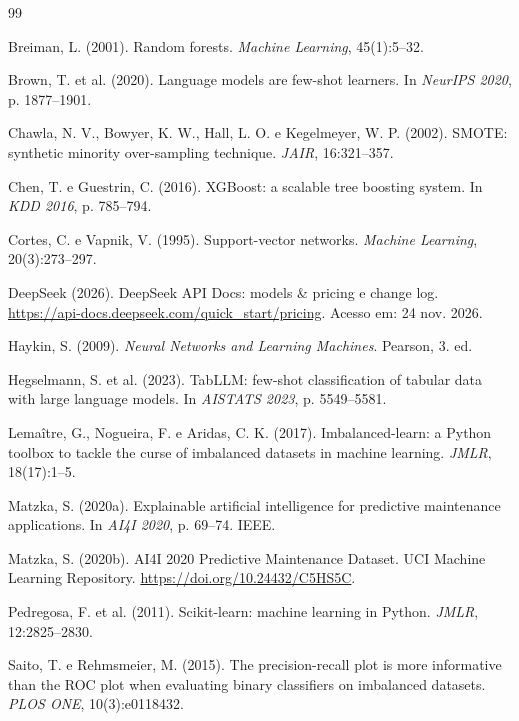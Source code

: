 \documentclass[12pt]{article}
\begin{document}
\begin{thebibliography}{99}
\footnotesize
\setlength{\itemsep}{0pt}

Breiman, L. (2001). Random forests. \textit{Machine Learning}, 45(1):5--32.

Brown, T. et al. (2020). Language models are few-shot learners. In \textit{NeurIPS 2020}, p. 1877--1901.

Chawla, N. V., Bowyer, K. W., Hall, L. O. e Kegelmeyer, W. P. (2002). SMOTE: synthetic minority over-sampling technique. \textit{JAIR}, 16:321--357.

Chen, T. e Guestrin, C. (2016). XGBoost: a scalable tree boosting system. In \textit{KDD 2016}, p. 785--794.

Cortes, C. e Vapnik, V. (1995). Support-vector networks. \textit{Machine Learning}, 20(3):273--297.

DeepSeek (2026). DeepSeek API Docs: models \& pricing e change log. \url{https://api-docs.deepseek.com/quick_start/pricing}. Acesso em: 24 nov. 2026.

Haykin, S. (2009). \textit{Neural Networks and Learning Machines}. Pearson, 3. ed.

Hegselmann, S. et al. (2023). TabLLM: few-shot classification of tabular data with large language models. In \textit{AISTATS 2023}, p. 5549--5581.

Lemaître, G., Nogueira, F. e Aridas, C. K. (2017). Imbalanced-learn: a Python toolbox to tackle the curse of imbalanced datasets in machine learning. \textit{JMLR}, 18(17):1--5.

Matzka, S. (2020a). Explainable artificial intelligence for predictive maintenance applications. In \textit{AI4I 2020}, p. 69--74. IEEE.

Matzka, S. (2020b). AI4I 2020 Predictive Maintenance Dataset. UCI Machine Learning Repository. \url{https://doi.org/10.24432/C5HS5C}.

Pedregosa, F. et al. (2011). Scikit-learn: machine learning in Python. \textit{JMLR}, 12:2825--2830.

Saito, T. e Rehmsmeier, M. (2015). The precision-recall plot is more informative than the ROC plot when evaluating binary classifiers on imbalanced datasets. \textit{PLOS ONE}, 10(3):e0118432.

\end{thebibliography}
\end{document}

